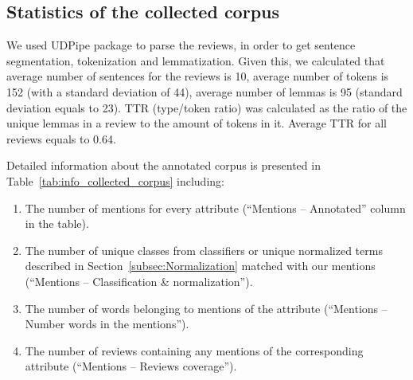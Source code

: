 \documentclass[a4paper,fleqn,longmktitle]{cas-dc}
\begin{document}



\subsection{Statistics of the collected corpus}\label{subsec:Statistics_of_corpus}
We used UDPipe\cite{straka2016udpipe} package to parse the reviews, in order to get sentence segmentation, tokenization and lemmatization. Given this, we calculated that average number of sentences for the reviews is 10, average number of tokens is 152 (with a standard deviation of 44), average number of lemmas is 95 (standard deviation equals to 23). TTR (type/token ratio) was calculated as the ratio of the unique lemmas in a review to the amount of tokens in it. Average TTR for all reviews equals to 0.64.

Detailed information about the annotated corpus is presented in Table~\ref{tab:info_collected_corpus} including:
\begin{enumerate}
    \item The number of mentions for every attribute (``Mentions -- Annotated'' column in the table).
    \item The number of unique classes from classifiers or unique normalized terms described in Section~\ref{subsec:Normalization} matched with our mentions (``Mentions -- Classification \& normalization'').
    \item The number of words belonging to mentions of the attribute (``Mentions -- Number words in the mentions'').
    \item The number of reviews containing any mentions of the corresponding attribute (``Mentions -- Reviews coverage'').
\end{enumerate}
\end{document}

